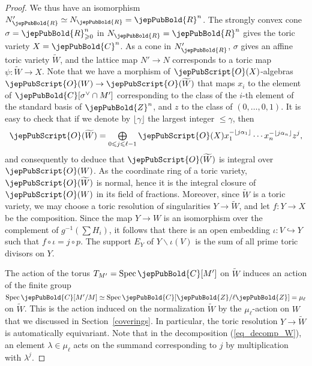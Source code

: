 \begin{proof}
We thus have an isomorphism $N'_{\jepPubBold{R}}\simeq N_{\jepPubBold{R}}=\jepPubBold{R}^n$. The strongly convex cone $\sigma=\jepPubBold{R}_{\geqslant 0}^n$ in 
$N_{\jepPubBold{R}}=\jepPubBold{R}^n$ gives the toric variety $X=\jepPubBold{C}^n$. As a cone in $N'_{\jepPubBold{R}}$, 
 $\sigma$ gives an affine toric variety $\widetilde{W}$, and the lattice map $N'\to N$ corresponds to a toric map
$\psi\colon \widetilde{W}\to X$. Note that we have a morphism of $\jepPubScript{O}(X)$-algebras 
$\jepPubScript{O}(W)\to \jepPubScript{O}(\widetilde{W})$ that maps $x_i$ to the element of $\jepPubBold{C}[\sigma^{\vee}\cap M']$
corresponding to the class of the $i$-th element of the standard basis of $\jepPubBold{Z}^n$, and $z$ to the class of $(0,\ldots,0,1)$. It is easy to check that
if we denote by $\lfloor \gamma\rfloor$ the largest integer $\leqslant\gamma$, then
\begin{equation}\label{eq_decomp_W}
\jepPubScript{O}(\widetilde{W})=\mathop{\textstyle\bigoplus}\limits_{0\leqslant j\leqslant\ell-1}\jepPubScript{O} (X)x_1^{-\lfloor j\alpha_1\rfloor}\cdots x_n^{-\lfloor j\alpha_n\rfloor}z^j,
\end{equation}
and consequently to deduce that $\jepPubScript{O}(\widetilde{W})$ is integral over $\jepPubScript{O}(W)$. As the coordinate ring of a toric variety, $\jepPubScript{O}(\widetilde{W})$
is normal, hence it is the integral closure of $\jepPubScript{O}(W)$ in its field of fractions.
Moreover, since $\widetilde{W}$ is a toric variety, we may choose a toric resolution of singularities $Y\to \widetilde{W}$, and let $f\colon Y\to X$ be the composition. Since the map
$Y\to W$ is an isomorphism over the complement of $g^{-1} (\sum H_i)$, it follows that there is an open embedding $\iota\colon V\hookrightarrow Y$ such that $f\circ\iota =j\circ p$. The support $E_Y$ of $Y\smallsetminus
\iota(V)$ is the sum of all prime toric divisors on $Y$. 

The action of the torus $T_{M'}={\rm Spec}\,\jepPubBold{C}[M']$ on $\widetilde{W}$ induces an action of the finite group
${\rm Spec}\,\jepPubBold{C}[M'/M]\simeq {\rm Spec}\,\jepPubBold{C}[\jepPubBold{Z}/\ell\jepPubBold{Z}]=\mu_{\ell}$ on 
$\widetilde{W}$. This is the action induced on the normalization $\widetilde{W}$ by the $\mu_{\ell}$-action on $W$ that we discussed in Section~\ref{coverings}. In particular,
the toric resolution $Y\to\widetilde{W}$ is automatically equivariant. Note that in the decomposition (\ref{eq_decomp_W}), an element $\lambda\in\mu_{\ell}$ acts on the 
summand corresponding to $j$ by multiplication with $\lambda^j$.



\end{proof}
